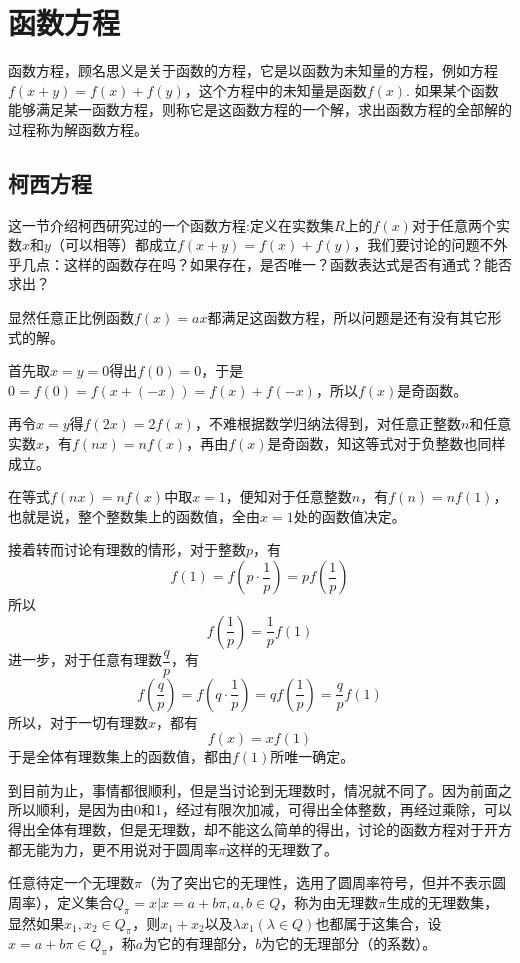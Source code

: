 
\section{函数方程}
\label{sec:function-equation}

函数方程，顾名思义是关于函数的方程，它是以函数为未知量的方程，例如方程$f(x+y)=f(x)+f(y)$，这个方程中的未知量是函数$f(x)$. 如果某个函数能够满足某一函数方程，则称它是这函数方程的一个解，求出函数方程的全部解的过程称为解函数方程。

\subsection{柯西方程}
\label{sec:cauchy-function-equality}

这一节介绍柯西研究过的一个函数方程:定义在实数集$R$上的$f(x)$对于任意两个实数$x$和$y$（可以相等）都成立$f(x+y)=f(x)+f(y)$，我们要讨论的问题不外乎几点：这样的函数存在吗？如果存在，是否唯一？函数表达式是否有通式？能否求出？

显然任意正比例函数$f(x)=ax$都满足这函数方程，所以问题是还有没有其它形式的解。

首先取$x=y=0$得出$f(0)=0$，于是$0=f(0)=f(x+(-x))=f(x)+f(-x)$，所以$f(x)$是奇函数。

再令$x=y$得$f(2x)=2f(x)$，不难根据数学归纳法得到，对任意正整数$n$和任意实数$x$，有$f(nx)=nf(x)$，再由$f(x)$是奇函数，知这等式对于负整数也同样成立。

在等式$f(nx)=nf(x)$中取$x=1$，便知对于任意整数$n$，有$f(n)=nf(1)$，也就是说，整个整数集上的函数值，全由$x=1$处的函数值决定。

接着转而讨论有理数的情形，对于整数$p$，有
\[ f(1)=f \left( p\cdot \frac{1}{p} \right) = p f \left( \frac{1}{p} \right) \]
所以
\[ f \left( \frac{1}{p} \right) = \frac{1}{p} f(1) \]
进一步，对于任意有理数$\dfrac{q}{p}$，有
\[ f \left( \frac{q}{p} \right) = f \left( q \cdot \frac{1}{p} \right) = q f \left( \frac{1}{p} \right) = \frac{q}{p} f(1) \]
所以，对于一切有理数$x$，都有
\[ f(x) = x f(1) \]
于是全体有理数集上的函数值，都由$f(1)$所唯一确定。

到目前为止，事情都很顺利，但是当讨论到无理数时，情况就不同了。因为前面之所以顺利，是因为由0和1，经过有限次加减，可得出全体整数，再经过乘除，可以得出全体有理数，但是无理数，却不能这么简单的得出，讨论的函数方程对于开方都无能为力，更不用说对于圆周率$\pi$这样的无理数了。

任意待定一个无理数$\pi$（为了突出它的无理性，选用了圆周率符号，但并不表示圆周率），定义集合$Q_{\pi}={x|x=a+b\pi,a,b\in Q}$，称为由无理数$\pi$生成的无理数集，显然如果$x_1,x_2 \in Q_{\pi}$，则$x_1+x_2$以及$\lambda x_1 (\lambda \in Q)$也都属于这集合，设$x=a+b\pi \in Q_{\pi}$，称$a$为它的有理部分，$b$为它的无理部分（的系数）。

